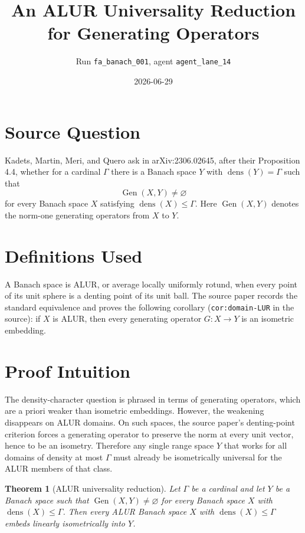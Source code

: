 \documentclass[11pt]{article}
\title{An ALUR Universality Reduction for Generating Operators}
\author{Run \texttt{fa\_banach\_001}, agent \texttt{agent\_lane\_14}}
\date{2026-06-29}
\newtheorem{theorem}{Theorem}
\newcommand{\Gen}{\operatorname{Gen}}
\newcommand{\dens}{\operatorname{dens}}
\begin{document}
\maketitle

\section*{Source Question}

Kadets, Martin, Meri, and Quero ask in arXiv:2306.02645, after their
Proposition 4.4, whether for a cardinal $\Gamma$ there is a Banach space
$Y$ with $\dens(Y)=\Gamma$ such that
\[
  \Gen(X,Y)\neq\varnothing
\]
for every Banach space $X$ satisfying $\dens(X)\leq \Gamma$.
Here $\Gen(X,Y)$ denotes the norm-one generating operators from $X$ to $Y$.

\section*{Definitions Used}

A Banach space is ALUR, or average locally uniformly rotund, when every point
of its unit sphere is a denting point of its unit ball.  The source paper
records the standard equivalence and proves the following corollary
(\texttt{cor:domain-LUR} in the source): if $X$ is ALUR, then every
generating operator $G\colon X\to Y$ is an isometric embedding.

\section*{Proof Intuition}

The density-character question is phrased in terms of generating operators,
which are a priori weaker than isometric embeddings.  However, the weakening
disappears on ALUR domains.  On such spaces, the source paper's denting-point
criterion forces a generating operator to preserve the norm at every unit
vector, hence to be an isometry.  Therefore any single range space $Y$ that
works for all domains of density at most $\Gamma$ must already be isometrically
universal for the ALUR members of that class.

\begin{theorem}[ALUR universality reduction]
Let $\Gamma$ be a cardinal and let $Y$ be a Banach space such that
$\Gen(X,Y)\neq\varnothing$ for every Banach space $X$ with
$\dens(X)\leq\Gamma$.  Then every ALUR Banach space $X$ with
$\dens(X)\leq\Gamma$ embeds linearly isometrically into $Y$.
\end{theorem}
\end{document}
